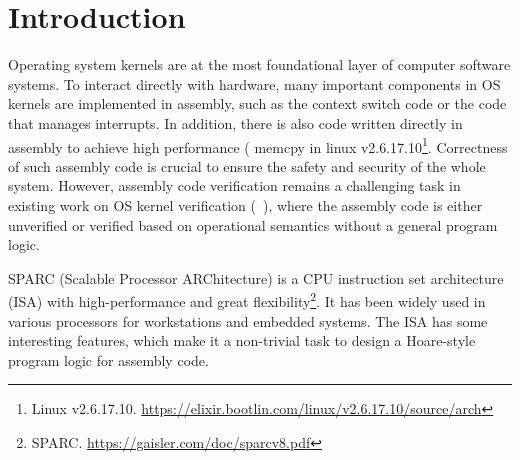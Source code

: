 \section{Introduction}

Operating system kernels are at
the most foundational layer of computer software systems.
To interact directly with hardware,
many important components in OS kernels are implemented
in assembly, such as the context switch code or the code that
manages interrupts.
In addition, there is also code written directly in assembly
to achieve high performance (\eg{} \textsf{memcpy} in linux
v2.6.17.10\footnote{Linux v2.6.17.10. \url{https://elixir.bootlin.com/linux/v2.6.17.10/source/arch}}.
Correctness of such assembly code is crucial to ensure
the safety and security of the whole system.
However, assembly code verification remains a challenging
task in existing work on OS kernel verification
(\eg~\cite{Xu16cav, sel4, deepspec}),
where the assembly code is either unverified or verified based on
operational semantics without a general program logic.

SPARC (Scalable Processor ARChitecture)
is a CPU instruction set architecture (ISA) with high-performance
and great flexibility\footnote{\label{fn:SPARC} SPARC. \url{https://gaisler.com/doc/sparcv8.pdf}}.
It has been widely used in various processors
for workstations and embedded systems. %
The \sparc{} ISA has some interesting features, which
make it a non-trivial task to design a Hoare-style
program logic for assembly code.


